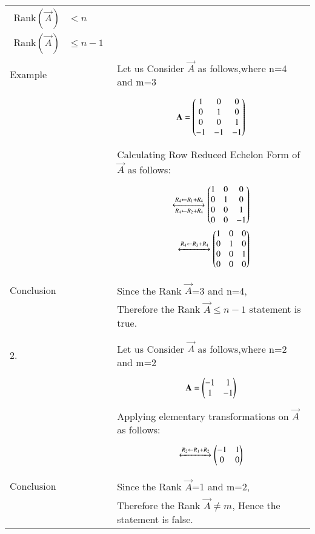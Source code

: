 \documentclass[journal,12pt]{IEEEtran}
\begin{document}
\begin{longtable}{|l|l|}
{\begin{align*}
    \mbox{Rank}(\vec{A}) &< n\\
    \mbox{Rank}(\vec{A}) &\leq n-1
\end{align*}}\\
Example&Let us Consider $\vec{A}$ as follows,where n=4 and m=3\\
&\parbox{6cm}{\begin{align*}
    \mathbf{A}=\begin{pmatrix}1&0&0\\0&1&0\\0&0&1\\-1&-1&-1\end{pmatrix}
\end{align*}}\\
&Calculating Row Reduced Echelon Form of $\vec{A}$ as follows:\\
&\parbox{6cm}{\begin{align*}
    \xleftrightarrow[R_4 \leftarrow R_2+R_4]{R_4 \leftarrow R_1+R_4}
		\begin{pmatrix}1&0&0\\0&1&0\\0&0&1\\0&0&-1\end{pmatrix}\\
	\xleftrightarrow[]{R_4 \leftarrow R_3+R_4}
		\begin{pmatrix}1&0&0\\0&1&0\\0&0&1\\0&0&0\end{pmatrix}
\end{align*}}\\
\hline
&\\
Conclusion&Since the Rank  $\vec{A}$=3 and n=4,\\
&Therefore the Rank $\vec{A} \leq n-1$ statement is true.\\
&\\
\hline
&\\
2.&Let us Consider $\vec{A}$ as follows,where n=2 and m=2\\
&\parbox{6cm}{\begin{align*}
    \mathbf{A}=\begin{pmatrix}-1&1\\1&-1\end{pmatrix}
\end{align*}}\\
&Applying elementary transformations on $\vec{A}$ as follows:\\
&\parbox{6cm}{\begin{align*}
    \xleftrightarrow[]{R_2 \leftarrow R_1+R_2}
		\begin{pmatrix}-1&1\\0&0\end{pmatrix}
\end{align*}}\\
\hline
&\\
Conclusion&Since the Rank  $\vec{A}$=1 and m=2,\\
&Therefore the Rank $\vec{A} \neq m$, Hence the statement is false.\\

\end{longtable}
\end{document}
